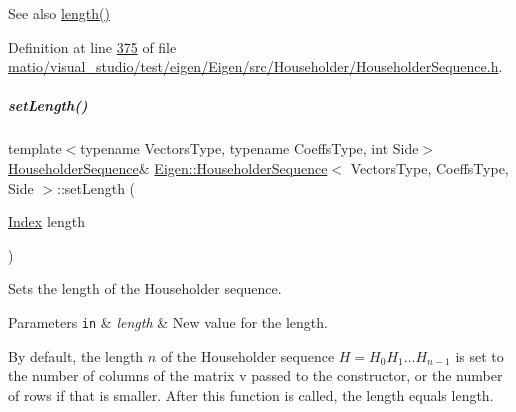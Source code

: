 \begin{DoxySeeAlso}{See also}
\hyperlink{group___householder___module_ac62fad812f3893f237378fe70e55bf66}{length()} 
\end{DoxySeeAlso}


Definition at line \hyperlink{matio_2visual__studio_2test_2eigen_2_eigen_2src_2_householder_2_householder_sequence_8h_source_l00375}{375} of file \hyperlink{matio_2visual__studio_2test_2eigen_2_eigen_2src_2_householder_2_householder_sequence_8h_source}{matio/visual\+\_\+studio/test/eigen/\+Eigen/src/\+Householder/\+Householder\+Sequence.\+h}.

\mbox{\label{group___householder___module_a30cc06d5b2ca4b7dcf5fcd53313d25fc}} 
\subparagraph{\texorpdfstring{set\+Length()}{setLength()}\hspace{0.1cm}{\footnotesize\ttfamily [2/2]}}
{\footnotesize\ttfamily template$<$typename Vectors\+Type, typename Coeffs\+Type, int Side$>$ \\
\hyperlink{group___householder___module_class_eigen_1_1_householder_sequence}{Householder\+Sequence}\& \hyperlink{group___householder___module_class_eigen_1_1_householder_sequence}{Eigen\+::\+Householder\+Sequence}$<$ Vectors\+Type, Coeffs\+Type, Side $>$\+::set\+Length (\begin{DoxyParamCaption}\item[{\hyperlink{group___core___module_a554f30542cc2316add4b1ea0a492ff02}{Index}}]{length }\end{DoxyParamCaption})\hspace{0.3cm}{\ttfamily [inline]}}



Sets the length of the Householder sequence. 


\begin{DoxyParams}[1]{Parameters}
\mbox{\tt in}  & {\em length} & New value for the length.\\
\hline
\end{DoxyParams}
By default, the length $ n $ of the Householder sequence $ H = H_0 H_1 \ldots H_{n-1} $ is set to the number of columns of the matrix {\ttfamily v} passed to the constructor, or the number of rows if that is smaller. After this function is called, the length equals {\ttfamily length}.

